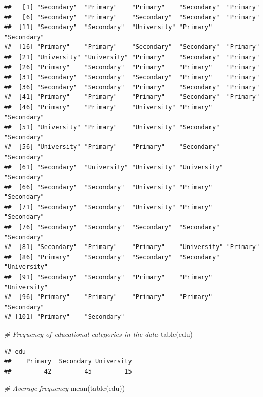 \documentclass[
]{book}
\newenvironment{Shaded}{\begin{snugshade}}{\end{snugshade}}
\newcommand{\CommentTok}[1]{\textcolor[rgb]{0.56,0.35,0.01}{\textit{#1}}}
\newcommand{\FunctionTok}[1]{\textcolor[rgb]{0.00,0.00,0.00}{#1}}
\newcommand{\NormalTok}[1]{#1}
\begin{document}
\begin{verbatim}
##   [1] "Secondary"  "Primary"    "Primary"    "Secondary"  "Primary"   
##   [6] "Secondary"  "Primary"    "Secondary"  "Secondary"  "Primary"   
##  [11] "Secondary"  "Secondary"  "University" "Primary"    "Secondary" 
##  [16] "Primary"    "Primary"    "Secondary"  "Secondary"  "Primary"   
##  [21] "University" "University" "Primary"    "Secondary"  "Primary"   
##  [26] "Primary"    "Secondary"  "Primary"    "Primary"    "Primary"   
##  [31] "Secondary"  "Secondary"  "Secondary"  "Primary"    "Primary"   
##  [36] "Secondary"  "Secondary"  "Primary"    "Secondary"  "Primary"   
##  [41] "Primary"    "Primary"    "Primary"    "Secondary"  "Primary"   
##  [46] "Primary"    "Primary"    "University" "Primary"    "Secondary" 
##  [51] "University" "Primary"    "University" "Secondary"  "Secondary" 
##  [56] "University" "Primary"    "Primary"    "Secondary"  "Secondary" 
##  [61] "Secondary"  "University" "University" "University" "Secondary" 
##  [66] "Secondary"  "Secondary"  "University" "Primary"    "Secondary" 
##  [71] "Secondary"  "Secondary"  "University" "Primary"    "Secondary" 
##  [76] "Secondary"  "Secondary"  "Secondary"  "Secondary"  "Secondary" 
##  [81] "Secondary"  "Primary"    "Primary"    "University" "Primary"   
##  [86] "Primary"    "Secondary"  "Secondary"  "Secondary"  "University"
##  [91] "Secondary"  "Secondary"  "Primary"    "Primary"    "University"
##  [96] "Primary"    "Primary"    "Primary"    "Primary"    "Secondary" 
## [101] "Primary"    "Secondary"
\end{verbatim}

\begin{Shaded}
\begin{Highlighting}[]
\CommentTok{\# Frequency of educational categories in the data}
\FunctionTok{table}\NormalTok{(edu)}
\end{Highlighting}
\end{Shaded}

\begin{verbatim}
## edu
##    Primary  Secondary University 
##         42         45         15
\end{verbatim}

\begin{Shaded}
\begin{Highlighting}[]
\CommentTok{\# Average frequency}
\FunctionTok{mean}\NormalTok{(}\FunctionTok{table}\NormalTok{(edu))}
\end{Highlighting}
\end{Shaded}
\end{document}
